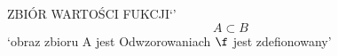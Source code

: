 \documentclass{article}
\begin{document}
ZBIÓR WARTOŚCI FUKCJI`\@'
    \[A \subset B\]
    `obraz zbioru A jest Odwzorowaniach $\f$ jest zdefionowany'
\end{document}
